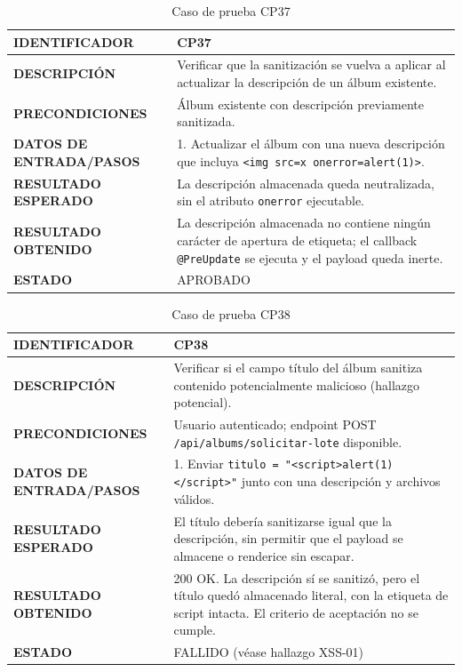 \begin{table}[H]
\centering
\caption{Caso de prueba CP37}
\begin{tabular}{|p{3.5cm}|p{10.3cm}|}
\hline
\textbf{IDENTIFICADOR} & CP37 \\
\hline
\textbf{DESCRIPCIÓN} & Verificar que la sanitización se vuelva a aplicar al actualizar la descripción de un álbum existente. \\
\hline
\textbf{PRECONDICIONES} & Álbum existente con descripción previamente sanitizada. \\
\hline
\textbf{DATOS DE ENTRADA/PASOS} & 1. Actualizar el álbum con una nueva descripción que incluya \texttt{\textless img src=x onerror=alert(1)\textgreater}. \\
\hline
\textbf{RESULTADO ESPERADO} & La descripción almacenada queda neutralizada, sin el atributo \texttt{onerror} ejecutable. \\
\hline
\textbf{RESULTADO OBTENIDO} & La descripción almacenada no contiene ningún carácter de apertura de etiqueta; el callback \texttt{@PreUpdate} se ejecuta y el payload queda inerte. \\
\hline
\textbf{ESTADO} & APROBADO \\
\hline
\end{tabular}
\end{table}

\begin{table}[H]
\centering
\caption{Caso de prueba CP38}
\begin{tabular}{|p{3.5cm}|p{10.3cm}|}
\hline
\textbf{IDENTIFICADOR} & CP38 \\
\hline
\textbf{DESCRIPCIÓN} & Verificar si el campo título del álbum sanitiza contenido potencialmente malicioso (hallazgo potencial). \\
\hline
\textbf{PRECONDICIONES} & Usuario autenticado; endpoint POST \texttt{/api/albums/solicitar-lote} disponible. \\
\hline
\textbf{DATOS DE ENTRADA/PASOS} & 1. Enviar \texttt{titulo = "\textless script\textgreater alert(1)\textless /script\textgreater"} junto con una descripción y archivos válidos. \\
\hline
\textbf{RESULTADO ESPERADO} & El título debería sanitizarse igual que la descripción, sin permitir que el payload se almacene o renderice sin escapar. \\
\hline
\textbf{RESULTADO OBTENIDO} & 200 OK. La descripción sí se sanitizó, pero el título quedó almacenado literal, con la etiqueta de script intacta. El criterio de aceptación no se cumple. \\
\hline
\textbf{ESTADO} & FALLIDO (véase hallazgo XSS-01) \\
\hline
\end{tabular}
\end{table}

